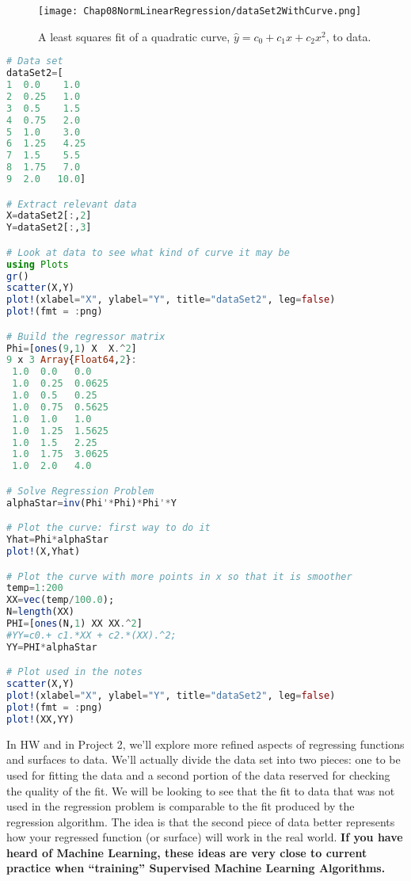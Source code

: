 \begin{figure}[!hbt]
        \centerline{\texttt{[image: Chap08NormLinearRegression/dataSet2WithCurve.png]}}
        \caption{A least squares fit of a quadratic curve, $\hat{y}=c_0 + c_1 x + c_2 x^2$, to data.}
        \label{fig:QuadraticLeastSqaures}
\end{figure}

\UseRawInputEncoding
  \begin{lstlisting}[language=Julia]
# Data set
dataSet2=[
1  0.0    1.0 
2  0.25   1.0
3  0.5    1.5
4  0.75   2.0
5  1.0    3.0
6  1.25   4.25
7  1.5    5.5
8  1.75   7.0 
9  2.0   10.0]

# Extract relevant data
X=dataSet2[:,2]
Y=dataSet2[:,3]

# Look at data to see what kind of curve it may be
using Plots
gr()
scatter(X,Y)
plot!(xlabel="X", ylabel="Y", title="dataSet2", leg=false)
plot!(fmt = :png)

# Build the regressor matrix
Phi=[ones(9,1) X  X.^2]
9 x 3 Array{Float64,2}:
 1.0  0.0   0.0
 1.0  0.25  0.0625
 1.0  0.5   0.25
 1.0  0.75  0.5625
 1.0  1.0   1.0
 1.0  1.25  1.5625
 1.0  1.5   2.25
 1.0  1.75  3.0625
 1.0  2.0   4.0

# Solve Regression Problem
alphaStar=inv(Phi'*Phi)*Phi'*Y

# Plot the curve: first way to do it
Yhat=Phi*alphaStar
plot!(X,Yhat)

# Plot the curve with more points in x so that it is smoother
temp=1:200
XX=vec(temp/100.0);
N=length(XX)
PHI=[ones(N,1) XX XX.^2]
#YY=c0.+ c1.*XX + c2.*(XX).^2;
YY=PHI*alphaStar

# Plot used in the notes
scatter(X,Y)
plot!(xlabel="X", ylabel="Y", title="dataSet2", leg=false)
plot!(fmt = :png)
plot!(XX,YY)
\end{lstlisting}

In HW and in Project 2, we'll explore more refined aspects of regressing functions and surfaces to data. We'll actually divide the data set into two pieces: one to be used for fitting the data and a second portion of the data reserved for checking the quality of the fit. We will be looking to see that the fit to data that was not used in the regression problem is comparable to the fit produced by the regression algorithm. The idea is that the second piece of data better represents how your regressed function (or surface) will work in the real world. \textbf{If you have heard of Machine Learning, these ideas are very close to current practice when ``training'' Supervised Machine Learning Algorithms.} 


